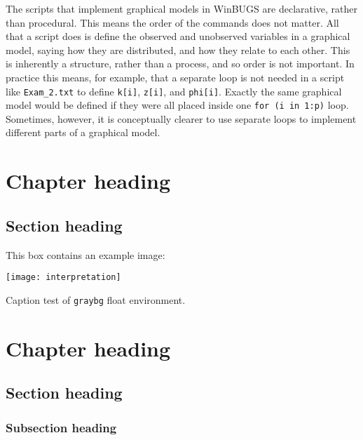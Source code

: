 \documentclass{bayeshyp}
\begin{document}
\lipsum

\begin{graybg}
  The scripts that implement graphical models in WinBUGS are declarative,
  rather than procedural. This means the order of the commands does not matter.
  All that a script does is define the observed and unobserved variables in a
  graphical model, saying how they are distributed, and how they relate to each
  other. This is inherently a structure, rather than a process, and so order is
  not important. In practice this means, for example, that a separate loop is
  not needed in a script like \texttt{Exam\_2.txt} to define \texttt{k[i]},
  \texttt{z[i]}, and \texttt{phi[i]}. Exactly the same graphical model would be
  defined if they were all placed inside one \texttt{for (i in 1:p)} loop.
  Sometimes, however, it is conceptually clearer to use separate loops to
  implement different parts of a graphical
  model.\label{scriptsforgraphicalmodels}
\end{graybg}

\lipsum

\chapter{Chapter heading}
\blindtext
\section{Section heading}%
\blindtext

\begin{graybg}
  This box contains an example image:\cite{Jaynes2003}

  \begin{center}
    \texttt{[image: interpretation]}
  \end{center}
  \caption{Caption test of \texttt{graybg} float environment.}
\end{graybg}

\chapter[byline={with Kevin}]{Chapter heading}
\section{Section heading}
\subsection{Subsection heading}
\end{document}
